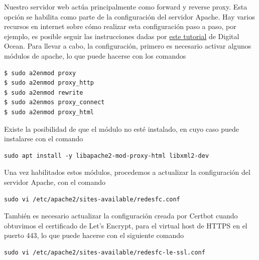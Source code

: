 \documentclass{article}
\begin{document}
Nuestro servidor web act\'ua principalmente como
forward y reverse proxy.   Esta opci\'on se habilita
como parte de la configuraci\'on del servidor Apache.
Hay varios recursos en internet sobre c\'omo realizar
esta configuraci\'on paso a paso, por ejemplo, es
posible seguir las instrucciones dadas por
\href{https://www.digitalocean.com/community/tutorials/how-to-use-apache-http-server-as-reverse-proxy-using-mod_proxy-extension}{este
tutorial} de Digital Ocean.   Para llevar a cabo,
la configuraci\'on, primero es necesario activar
algunos m\'odulos de apache, lo que puede hacerse
con los comandos
\begin{lstlisting}
$ sudo a2enmod proxy
$ sudo a2enmod proxy_http
$ sudo a2enmod rewrite
$ sudo a2enmos proxy_connect
$ sudo a2enmod proxy_html
\end{lstlisting}

Existe la posibilidad de que el m\'odulo no est\'e
instalado, en cuyo caso puede instalarse con el
comando
\begin{lstlisting}
sudo apt install -y libapache2-mod-proxy-html libxml2-dev
\end{lstlisting}

Una vez habilitados estos m\'odulos, procedemos
a actualizar la configuraci\'on del servidor
Apache, con el comando
\begin{lstlisting}
sudo vi /etc/apache2/sites-available/redesfc.conf
\end{lstlisting}

Tambi\'en es necesario actualizar la configuraci\'on
creada por Certbot cuando obtuvimos el certificado
de Let's Encrypt, para el virtual host de HTTPS en
el puerto 443, lo que puede hacerse con el siguiente
comando
\begin{lstlisting}
sudo vi /etc/apache2/sites-available/redesfc-le-ssl.conf
\end{lstlisting}
\end{document}
